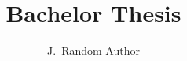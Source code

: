 \documentclass{tudelft-report}
\begin{document}
\frontmatter

\title[A Domain Specific Language and Web-Based Interpreter for Music Notation]{Bachelor Thesis}
\author{J.\ Random Author}
\makecover




\tableofcontents

\mainmatter



\appendix

%


\end{document}
